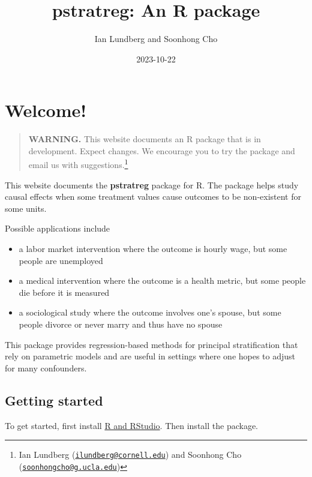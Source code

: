 \documentclass[
]{book}
\title{pstratreg: An R package}
\author{Ian Lundberg and Soonhong Cho}
\date{2023-10-22}
\providecommand{\tightlist}{%
  \setlength{\itemsep}{0pt}\setlength{\parskip}{0pt}}
\begin{document}
\maketitle

{
\setcounter{tocdepth}{1}
\tableofcontents
}
\hypertarget{welcome}{%
\chapter*{Welcome!}\label{welcome}}

\begin{quote}
\textbf{WARNING.} This website documents an R package that is in development. Expect changes. We encourage you to try the package and email us with suggestions.\footnote{Ian Lundberg (\href{mailto:ilundberg@cornell.edu}{\nolinkurl{ilundberg@cornell.edu}}) and Soonhong Cho (\href{mailto:soonhongcho@g.ucla.edu}{\nolinkurl{soonhongcho@g.ucla.edu}})}
\end{quote}

This website documents the \textbf{pstratreg} package for R. The package helps study causal effects when some treatment values cause outcomes to be non-existent for some units.

Possible applications include

\begin{itemize}
\tightlist
\item
  a labor market intervention where the outcome is hourly wage, but some people are unemployed
\item
  a medical intervention where the outcome is a health metric, but some people die before it is measured
\item
  a sociological study where the outcome involves one's spouse, but some people divorce or never marry and thus have no spouse
\end{itemize}

This package provides regression-based methods for principal stratification that rely on parametric models and are useful in settings where one hopes to adjust for many confounders.

\hypertarget{getting-started}{%
\section*{Getting started}\label{getting-started}}

To get started, first install \href{https://rstudio-education.github.io/hopr/starting.html}{R and RStudio}. Then install the package.
\end{document}
